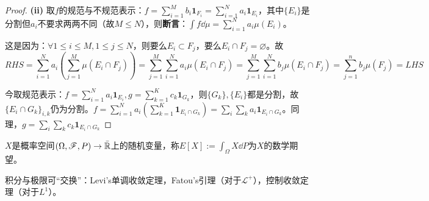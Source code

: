 \documentclass{ctexbook}
\begin{document}
\begin{proof}
  \textbf{(ii)} 取$f$的规范与不规范表示：$f=\sum_{i=1}^{M}b_{i}\bm 1_{F_{i}}=\sum_{i=1}^{N}a_{i}\bm 1_{E_{i}}$，其中$\{E_{i}\}$是分割但$a_{i}$不要求两两不同（故$M\leq N$），则\textbf{断言}：$\int f\dd\mu=\sum_{i=1}^{N}a_{i}\mu(E_{i})$。

  这是因为：$\forall 1\leq i\leq M,1\leq j\leq N$，则要么$E_{i}\subset F_{j}$，要么$E_{i}\cap F_{j}=\varnothing$。故
  \[RHS=\sum_{i=1}^{N}a_{i}(\sum_{j=1}^{M}\mu(E_{i}\cap F_{j}))=\sum_{j=1}^{M}\sum_{i=1}^{N}a_{i}\mu(E_{i}\cap F_{j})=\sum_{j=1}^{M}\sum_{i=1}^{N}b_{j}\mu(E_{i}\cap F_{j})=\sum_{j=1}^{n}b_{j}\mu(F_{j})=LHS\]

    今取规范表示：$f=\sum_{i=1}^{N}a_{i}\bm{1}_{E_{i}},g=\sum_{k=1}^{K}c_{k}\bm{1}_{G_{k}}$，则$\{G_{k}\},\{E_{i}\}$都是分割，故$\{E_{i}\cap G_{k}\}_{i,k}$仍为分割。$f=\sum_{i=1}^{N}a_{i}(\sum_{k=1}^{K}\bm{1}_{E_{i}\cap G_{k}})=\sum_{i}\sum_{k}a_{i}\bm 1_{E_{i}\cap G_{k}}$。同理，$g=\sum_{i}\sum_{k}c_{k}\bm{1}_{E_{i}\cap G_{k}}$
\end{proof}
\begin{Def}
$X$是概率空间$(\Omega,\mathscr{F},P)\to\bar{\mathbb{R}}$上的随机变量，称$E[X]:=\int_{\Omega}X\dd P$为$X$的数学期望。
\end{Def}

\begin{Rmk}
  积分与极限可“交换”：Levi's单调收敛定理，Fatou's引理（对于$\mathcal{L}^{+}$），控制收敛定理（对于$L^{1}$）。
\end{Rmk}
\end{document}
